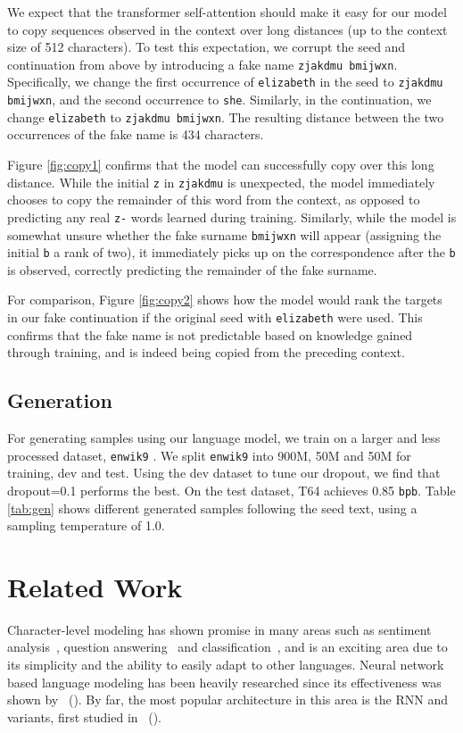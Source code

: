 We expect that the transformer self-attention should make it easy for our model to copy sequences observed in the context over long distances (up to the context size of 512 characters). To test this expectation, we corrupt the seed and continuation from above by introducing a fake name \texttt{zjakdmu bmijwxn}. Specifically, we change the first occurrence of \texttt{elizabeth} in the seed to \texttt{zjakdmu bmijwxn}, and the second occurrence to \texttt{she}. Similarly, in the continuation, we change \texttt{elizabeth} to \texttt{zjakdmu bmijwxn}. The resulting distance between the two occurrences of the fake name is 434 characters.

Figure \ref{fig:copy1} confirms that the model can successfully copy over this long distance. While the initial \texttt{z} in \texttt{zjakdmu} is unexpected, the model immediately chooses to copy the remainder of this word from the context, as opposed to predicting any real \texttt{z-} words learned during training. Similarly, while the model is somewhat unsure whether the fake surname \texttt{bmijwxn} will appear (assigning the initial \texttt{b} a rank of two), it immediately picks up on the correspondence after the \texttt{b} is observed, correctly predicting the remainder of the fake surname.

For comparison, Figure \ref{fig:copy2} shows how the model would rank the targets in our fake continuation if the original seed with \texttt{elizabeth} were used. This confirms that the fake name is not predictable based on knowledge gained through training, and is indeed being copied from the preceding context.

\subsection{Generation}
For generating samples using our language model, we train on a larger and less processed dataset, \texttt{enwik9} \cite{mahoney}. We split \texttt{enwik9} into 900M, 50M and 50M for training, dev and test. Using the dev dataset to tune our dropout, we find that dropout=0.1 performs the best. On the test dataset, \textsc{T64} achieves 0.85 \texttt{bpb}.
Table \ref{tab:gen} shows different generated samples following the seed text, using a sampling temperature of 1.0.

\section{Related Work} Character-level modeling has shown promise in many areas such as sentiment analysis~\cite{DBLP:journals/corr/RadfordJS17}, question answering~\cite{kenter2018byte} and classification~\cite{DBLP:journals/corr/ZhangZL15}, and is an exciting area due to its simplicity and the ability to easily adapt to other languages. Neural network based language modeling has been heavily researched since its effectiveness was shown by \citeauthor{Bengio:2003:NPL:944919.944966}~(\citeyear{Bengio:2003:NPL:944919.944966}).
By far, the most popular architecture in this area is the RNN and variants, first studied in \citeauthor{conf/interspeech/MikolovKBCK10}~(\citeyear{conf/interspeech/MikolovKBCK10}).

